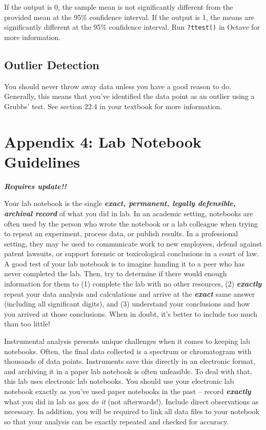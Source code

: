 \documentclass[]{tufte-book}
\begin{document}
If the output is 0, the sample mean is not significantly different from the provided mean at the 95\% confidence interval. If the output is 1, the means are significantly different at the 95\% confidence interval. Run \texttt{?ttest()} in Octave for more information.

\hypertarget{outlier-detection}{%
\section*{Outlier Detection}\label{outlier-detection}}

You should never throw away data unless you have a good reason to do. Generally, this means that you've identified the data point as an outlier using a Grubbs' test. See section 22.4 in your textbook for more information.

\hypertarget{appendix-4-lab-notebook-guidelines}{%
\chapter*{Appendix 4: Lab Notebook Guidelines}\label{appendix-4-lab-notebook-guidelines}}

\textbf{\emph{Requires update!!}}

Your lab notebook is the single \textbf{\emph{exact, permanent, legally defensible, archival record}} of what you did in lab. In an academic setting, notebooks are often used by the person who wrote the notebook or a lab colleague when trying to repeat an experiment, process data, or publish results. In a professional setting, they may be used to communicate work to new employees, defend against patent lawsuits, or support forensic or toxicological conclusions in a court of law. A good test of your lab notebook is to imagine handing it to a peer who has never completed the lab. Then, try to determine if there would enough information for them to (1) complete the lab with no other resources, (2) \textbf{\emph{exactly}} repeat your data analysis and calculations and arrive at the \textbf{\emph{exact}} same answer (including all significant digits), and (3) understand your conclusions and how you arrived at those conclusions. When in doubt, it's better to include too much than too little!

Instrumental analysis presents unique challenges when it comes to keeping lab notebooks. Often, the final data collected is a spectrum or chromatogram with thousands of data points. Instruments save this directly in an electronic format, and archiving it in a paper lab notebook is often unfeasible. To deal with that, this lab uses electronic lab notebooks. You should use your electronic lab notebook exactly as you've used paper notebooks in the past -- record \textbf{\emph{exactly}} what you did in lab \emph{as you do it} (not afterwards!). Include direct observations as necessary. In addition, you will be required to link all data files to your notebook so that your analysis can be exactly repeated and checked for accuracy.
\end{document}

